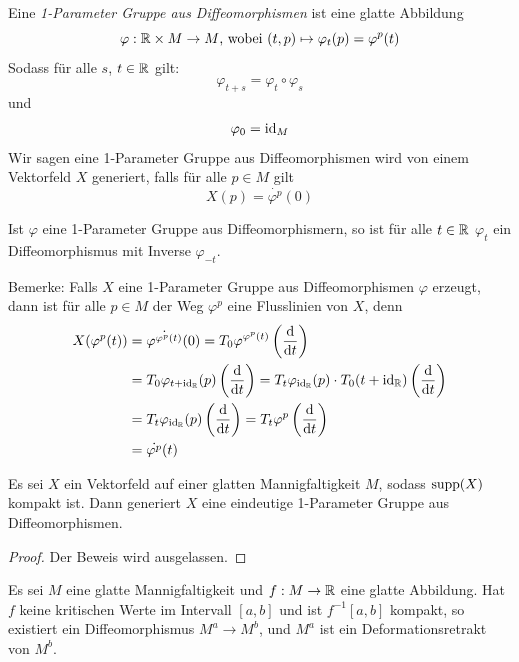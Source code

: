 \begin{definition}
    Eine \textit{1-Parameter Gruppe aus Diffeomorphismen} ist eine glatte 
    Abbildung
    \[ \varphi: { \mathbb R } \times M \to M \text{, wobei } (t, p) \mapsto \varphi_t(p) = \varphi^p(t) \]
    Sodass für alle $s$, $t \in { \mathbb R }$ gilt:
    \[ \varphi_{t + s} = \varphi_t \circ \varphi_s \]
    und 
    \[ \varphi_0 = { \operatorname{id} }_M \]
    Wir sagen eine 1-Parameter Gruppe aus Diffeomorphismen wird von einem
    Vektorfeld $X$ generiert, falls für alle $p \in M$ gilt
    \[ X(p) = \dot{\varphi^p}(0) \]
\end{definition}

Ist $\varphi$ eine 1-Parameter Gruppe aus Diffeomorphismern, so ist für alle 
$t \in { \mathbb R }$ $\varphi_t$ ein Diffeomorphismus mit Inverse $\varphi_{-t}$.

Bemerke: Falls $X$ eine 1-Parameter Gruppe aus Diffeomorphismen $\varphi$ erzeugt,
dann ist für alle $p \in M$ der Weg $\varphi^p$ eine Flusslinien von $X$, denn
\begin{align*}
    X(\varphi^p(t)) 
    & = \dot{\varphi^{\varphi^p(t)}}(0)
    = T_0 \varphi^{\varphi^p(t)} \left({ \frac{{ \operatorname{d} } }{{ \operatorname{d} } t} }\right) \\
    & = T_0 \varphi_{t + { \operatorname{id} }_{{ \mathbb R }}}(p) \left({ \frac{{ \operatorname{d} } }{{ \operatorname{d} } t} }\right)
    = T_t \varphi_{{ \operatorname{id} }_{{ \mathbb R }}}(p) \cdot T_0 (t + { \operatorname{id} }_{{ \mathbb R }}) \left({ \frac{{ \operatorname{d} } }{{ \operatorname{d} } t} }\right) \\
    & = T_t \varphi_{{ \operatorname{id} }_{{ \mathbb R }}}(p) \left({ \frac{{ \operatorname{d} } }{{ \operatorname{d} } t} }\right)
    = T_t \varphi^p \left({ \frac{{ \operatorname{d} } }{{ \operatorname{d} } t} }\right) \\
    & = \dot{\varphi^p}(t)
\end{align*}

\begin{lemma}
    \label{lemma:generierende vektorfelder}
    Es sei $X$ ein Vektorfeld auf einer glatten Mannigfaltigkeit $M$, sodass
    ${ \operatorname{supp} }(X)$ kompakt ist. Dann generiert $X$ eine eindeutige 
    1-Parameter Gruppe aus Diffeomorphismen.
\end{lemma}

\begin{proof} Der Beweis wird ausgelassen. \end{proof}

\begin{theorem}
    \label{theorem:erstes deformationslemma}
    Es sei $M$ eine glatte Mannigfaltigkeit und $f: M \rightarrow { \mathbb R }$ eine
    glatte Abbildung. Hat $f$ keine kritischen Werte im Intervall $[a, b]$ und 
    ist $f^{-1}[a, b]$ kompakt, so existiert ein Diffeomorphismus 
    $M^a \rightarrow M^b$, und $M^a$ ist ein Deformationsretrakt von $M^b$.
\end{theorem}

